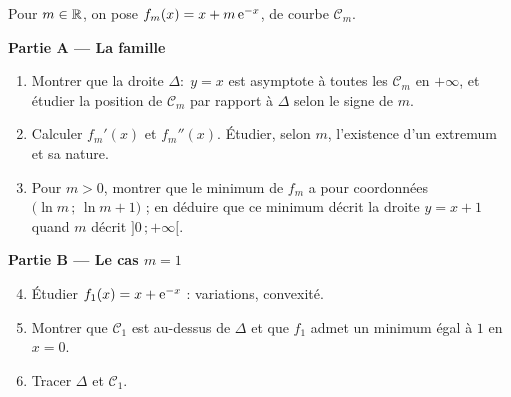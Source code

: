 Pour $m\in\mathbb{R}$, on pose $f_m(x)=x+m\,\mathrm{e}^{-x}$, de courbe $\mathcal C_m$.

\textbf{Partie A — La famille}
\begin{enumerate}
	\item Montrer que la droite $\Delta:\;y=x$ est asymptote à toutes les
	$\mathcal C_m$ en $+\infty$, et étudier la position de $\mathcal C_m$ par
	rapport à $\Delta$ selon le signe de $m$.
	\item Calculer $f_m'(x)$ et $f_m''(x)$. Étudier, selon $m$, l'existence
	d'un extremum et sa nature.
	\item Pour $m>0$, montrer que le minimum de $f_m$ a pour coordonnées
	$\bigl(\ln m\,;\,\ln m+1\bigr)$ ; en déduire que ce minimum décrit la
	droite $y=x+1$ quand $m$ décrit $]0\,;+\infty[$.
\end{enumerate}

\textbf{Partie B — Le cas $m=1$}
\begin{enumerate}
	\setcounter{enumi}{3}
	\item Étudier $f_1(x)=x+\mathrm{e}^{-x}$ : variations, convexité.
	\item Montrer que $\mathcal C_1$ est au-dessus de $\Delta$ et que $f_1$
	admet un minimum égal à $1$ en $x=0$.
	\item Tracer $\Delta$ et $\mathcal C_1$.
\end{enumerate}
